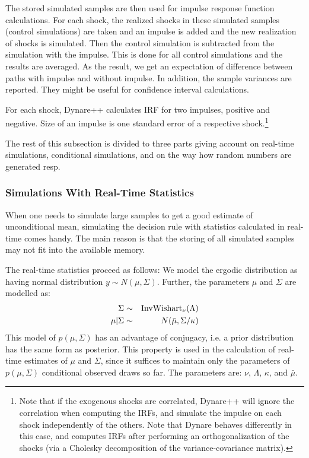 \documentclass[10pt]{article}
\begin{document}
The stored simulated samples are then used for impulse response
function calculations. For each shock, the realized shocks in these
simulated samples (control simulations) are taken and an impulse is
added and the new realization of shocks is simulated. Then the control
simulation is subtracted from the simulation with the impulse. This is
done for all control simulations and the results are averaged. As the
result, we get an expectation of difference between paths with impulse
and without impulse. In addition, the sample variances are
reported. They might be useful for confidence interval calculations.

For each shock, Dynare++ calculates IRF for two impulses, positive and
negative. Size of an impulse is one standard error of a respective
shock.\footnote{Note that if the exogenous shocks are correlated, Dynare++ will
  ignore the correlation when computing the IRFs, and simulate the impulse on
  each shock independently of the others. Note that Dynare behaves differently
  in this case, and computes IRFs after performing an orthogonalization of the
  shocks (via a Cholesky decomposition of the variance-covariance matrix).}

The rest of this subsection is divided to three parts giving account
on real-time simulations, conditional simulations, and on the way how
random numbers are generated resp.

\subsubsection{Simulations With Real-Time Statistics}
\label{rt_simul}

When one needs to simulate large samples to get a good estimate of
unconditional mean, simulating the decision rule with statistics
calculated in real-time comes handy. The main reason is that the
storing of all simulated samples may not fit into the available
memory.

The real-time statistics proceed as follows: We model the ergodic
distribution as having normal distribution $y\sim N(\mu,\Sigma)$. Further,
the parameters $\mu$ and $\Sigma$ are modelled as:
\begin{eqnarray*}
  \Sigma &\sim& {\rm InvWishart}_\nu(\Lambda)\\
  \mu|\Sigma &\sim& N(\bar\mu,\Sigma/\kappa) \\ 
\end{eqnarray*}
This model of $p(\mu,\Sigma)$ has an advantage of conjugacy, i.e. a
prior distribution has the same form as posterior. This property is
used in the calculation of real-time estimates of $\mu$ and $\Sigma$,
since it suffices to maintain only the parameters of $p(\mu,\Sigma)$
conditional observed draws so far. The parameters are: $\nu$,
$\Lambda$, $\kappa$, and $\bar\mu$.
\end{document}
